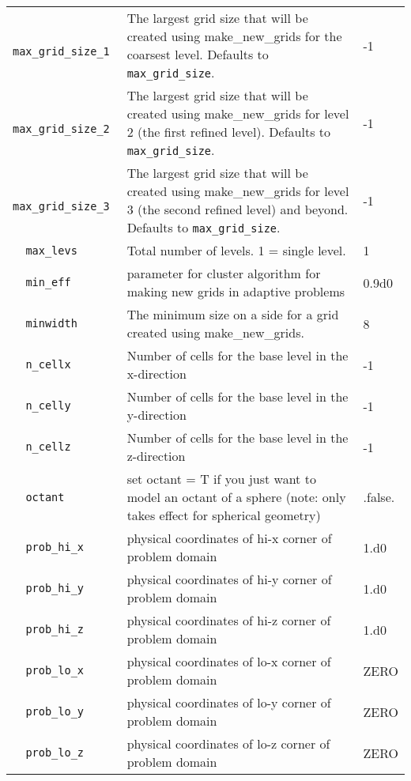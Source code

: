 \begin{landscape}
{\begin{center}
\begin{longtable}{|l|p{5.25in}|l|}
\verb=  max_grid_size_1  = &   The largest grid size that will be created using make\_new\_grids for the coarsest level.  Defaults to {\tt max\_grid\_size}.  &  -1 \\
\rowcolor{tableShade}
\verb=  max_grid_size_2  = &   The largest grid size that will be created using make\_new\_grids for level 2 (the first refined level).  Defaults to {\tt max\_grid\_size}.  &  -1 \\
\verb=  max_grid_size_3  = &   The largest grid size that will be created using make\_new\_grids for level 3 (the second refined level) and beyond.  Defaults to {\tt max\_grid\_size}.  &  -1 \\
\rowcolor{tableShade}
\verb=  max_levs  = &   Total number of levels.  1 = single level.  &  1 \\
\verb=  min_eff  = &   parameter for cluster algorithm for making new grids in adaptive problems  &  0.9d0 \\
\rowcolor{tableShade}
\verb=  minwidth  = &   The minimum size on a side for a grid created using make\_new\_grids.  &  8 \\
\verb=  n_cellx  = &   Number of cells for the base level in the x-direction  &  -1 \\
\rowcolor{tableShade}
\verb=  n_celly  = &   Number of cells for the base level in the y-direction  &  -1 \\
\verb=  n_cellz  = &   Number of cells for the base level in the z-direction  &  -1 \\
\rowcolor{tableShade}
\verb=  octant  = &   set octant = T if you just want to model an octant of a sphere (note: only takes effect for spherical geometry)  &  .false. \\
\verb=  prob_hi_x  = &   physical coordinates of hi-x corner of problem domain  &  1.d0 \\
\rowcolor{tableShade}
\verb=  prob_hi_y  = &   physical coordinates of hi-y corner of problem domain  &  1.d0 \\
\verb=  prob_hi_z  = &   physical coordinates of hi-z corner of problem domain  &  1.d0 \\
\rowcolor{tableShade}
\verb=  prob_lo_x  = &   physical coordinates of lo-x corner of problem domain  &  ZERO \\
\verb=  prob_lo_y  = &   physical coordinates of lo-y corner of problem domain  &  ZERO \\
\rowcolor{tableShade}
\verb=  prob_lo_z  = &   physical coordinates of lo-z corner of problem domain  &  ZERO \\

\end{longtable}
\end{center}}
\end{landscape}
